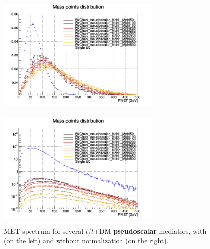 \documentclass[a4paper, 10pt, openright]{report}
\begin{document}
\begin{figure}[htbp]
\centering
\begin{minipage}[b]{.49\textwidth}
\includegraphics[width=8cm, height=6cm]{figs/singleTopPseudoMETNorm.png}
\end{minipage}\hfill
\begin{minipage}[b]{.49\textwidth}
\includegraphics[width=8cm, height=6cm]{figs/singleTopPseudoMET.png}
\end{minipage} \hfill
\caption{\ac{MET} spectrum for several $t/\bar t$+DM \textbf{pseudoscalar} mediators, with (on the left) and without normalization (on the right).}
\label{fig:signalSinglePseudo}
\end{figure}
\end{document}
